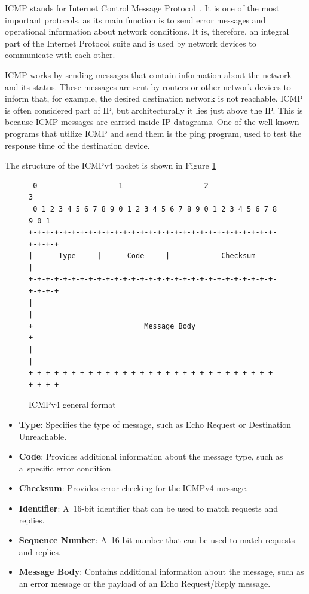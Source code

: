 \documentclass[
  printed,     %
  color,       %
  oneside,     %
  nosansbold,  %
  nocolorbold, %
  nolof,         %
  nolot,         %
]{fithesis4}
\begin{document}
ICMP stands for Internet Control Message Protocol~\cite{RFC0792}. It is one of the most important protocols, as its main function is to send error messages and operational information about network conditions. It is, therefore, an integral part of the Internet Protocol suite and is used by network devices to communicate with each other.

ICMP works by sending messages that contain information about the network and its status. These messages are sent by routers or other network devices to inform that, for example, the desired destination network is not reachable. ICMP is often considered part of IP, but architecturally it lies just above the IP. This is because ICMP messages are carried inside IP datagrams. One of the well-known programs that utilize ICMP and send them is the ping program, used to test the response time of the destination device.

The structure of the ICMPv4 packet is shown in Figure \ref{fig:icmp}

\begin{figure}[h]
\fontsize{10pt}{10pt}\selectfont
\begin{center}
\begin{BVerbatim}
 0                   1                   2                   3  
 0 1 2 3 4 5 6 7 8 9 0 1 2 3 4 5 6 7 8 9 0 1 2 3 4 5 6 7 8 9 0 1
+-+-+-+-+-+-+-+-+-+-+-+-+-+-+-+-+-+-+-+-+-+-+-+-+-+-+-+-+-+-+-+-+
|      Type     |      Code     |            Checksum           |
+-+-+-+-+-+-+-+-+-+-+-+-+-+-+-+-+-+-+-+-+-+-+-+-+-+-+-+-+-+-+-+-+
|                                                               |
+                          Message Body                         +
|                                                               |
+-+-+-+-+-+-+-+-+-+-+-+-+-+-+-+-+-+-+-+-+-+-+-+-+-+-+-+-+-+-+-+-+
\end{BVerbatim}
\end{center}
  \caption{ICMPv4 general format~\cite{RFC0792}}
  \label{fig:icmp}
\end{figure}

\begin{itemize}[noitemsep,topsep=0pt]
    \item \textbf{Type}: Specifies the type of message, such as Echo Request or Destination Unreachable.
    \item \textbf{Code}: Provides additional information about the message type, such as a~specific error condition.
    \item \textbf{Checksum}: Provides error-checking for the ICMPv4 message.
    \item \textbf{Identifier}: A~16-bit identifier that can be used to match requests and replies.
    \item \textbf{Sequence Number}: A~16-bit number that can be used to match requests and replies.
    \item \textbf{Message Body}: Contains additional information about the message, such as an error message or the payload of an Echo Request/Reply message.
\end{itemize}
\end{document}
